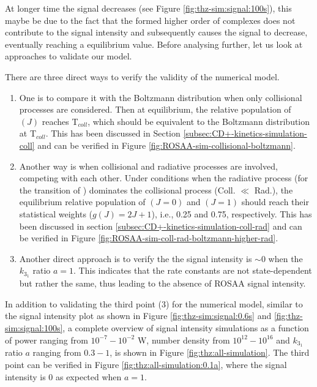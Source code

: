 At longer time the signal decreases (see Figure \ref{fig:thz-sim:signal:100s}),
this maybe be due to the fact that the formed higher order of complexes 
does not contribute to the signal intensity and subsequently causes the signal to decrease, 
eventually reaching a equilibrium value. 
Before analysing further, let us look at approaches to validate our model.


There are three direct ways to verify the validity of the numerical model.

\begin{enumerate}
    \item  One is to compare it with the Boltzmann distribution when only collisional
          processes are considered. Then at equilibrium, the relative population of
          \CD$(J)$ reaches T$_{coll}$, which should be equivalent to the
          Boltzmann distribution at T$_{coll}$. This has been discussed in Section
          \ref{subsec:CD+-kinetics-simulation-coll} and can be verified in Figure
          \ref{fig:ROSAA-sim-collisional-boltzmann}.
    \item Another way is when collisional and radiative processes are involved,
          competing with each other. Under conditions when the radiative process (for
          the \CDline transition of \CD) dominates the collisional process (Coll. $\ll$
          Rad.), the equilibrium relative population of \CD$(J=0)$ and \CD$(J=1)$ should
          reach their statistical weights ($g(J) = 2J+1$), i.e., 0.25 and 0.75,
          respectively. This has been discussed in section
          \ref{subsec:CD+-kinetics-simulation-coll-rad} and can be verified in Figure
          \ref{fig:ROSAA-sim-coll-rad-boltzmann-higher-rad}.
    \item Another direct approach is to verify the the signal intensity is $\sim 0$ when
          the $k_{3_1}$ ratio $a=1$. This indicates that the rate constants are not
          state-dependent but rather the same, thus leading to the absence of ROSAA
          signal intensity.
\end{enumerate}

In addition to validating the third point (3) for the numerical model, similar
to the signal intensity plot as shown in Figure \ref{fig:thz-sim:signal:0.6s}
and \ref{fig:thz-sim:signal:100s}, a complete overview of signal intensity
simulations as a function of power ranging from $10^{-7}-10^{-2}$ W, number
density from $10^{12}-10^{16}$ \percc and $k_{3_1}$ ratio $a$ ranging from
$0.3-1$, is shown in Figure \ref{fig:thz:all-simulation}. The third point can
be verified in Figure \ref{fig:thz:all-simulation:0.1a}, where the
signal intensity is 0 as expected when $a=1$.\\


